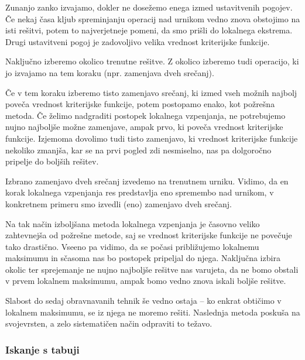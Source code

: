 \documentclass[a4paper,10pt]{article}
\begin{document}
   Zunanjo zanko izvajamo, dokler ne dosežemo enega izmed ustavitvenih pogojev.
   Če nekaj časa kljub spreminjanju operacij nad urnikom vedno znova obstojimo na isti
   rešitvi, potem to najverjetneje pomeni, da smo prišli do lokalnega ekstrema. Drugi
   ustavitveni pogoj je zadovoljivo velika vrednost kriterijske funkcije.

   Naključno izberemo okolico trenutne rešitve. Z okolico izberemo tudi operacijo,
   ki jo izvajamo na tem koraku (npr. zamenjava dveh srečanj).

   Če v tem koraku izberemo tisto zamenjavo srečanj, ki izmed vseh možnih najbolj
   poveča vrednost kriterijske funkcije, potem postopamo enako, kot požrešna metoda. Če
   želimo nadgraditi postopek lokalnega vzpenjanja, ne potrebujemo nujno najboljše možne
   zamenjave, ampak prvo, ki poveča vrednost kriterijske funkcije. Izjemoma dovolimo tudi
   tisto zamenjavo, ki vrednost kriterijske funkcije nekoliko zmanjša, kar se na prvi
   pogled zdi nesmiselno, nas pa dolgoročno pripelje do boljših rešitev.

   Izbrano zamenjavo dveh srečanj izvedemo na trenutnem urniku. Vidimo, da en korak
   lokalnega vzpenjanja res predstavlja eno spremembo nad urnikom, v konkretnem primeru
   smo izvedli (eno) zamenjavo dveh srečanj.

Na tak način izboljšana metoda lokalnega vzpenjanja je časovno veliko zahtevnejša od
požrešne metode, saj se vrednost kriterijske funkcije ne povečuje tako drastično. Vseeno
pa vidimo, da se počasi približujemo lokalnemu maksimumu in sčasoma nas bo postopek
pripeljal do njega. Naključna izbira okolic ter sprejemanje ne nujno najboljše rešitve
nas varujeta, da ne bomo obstali v prvem lokalnem maksimumu, ampak bomo vedno znova
iskali boljše rešitve.

Slabost do sedaj obravnavanih tehnik še vedno ostaja -- ko enkrat obtičimo v lokalnem
maksimumu, se iz njega ne moremo rešiti. Naslednja metoda poskuša na svojevrsten, a zelo
sistematičen način odpraviti to težavo.

\subsubsection{Iskanje s tabuji}
\end{document}
